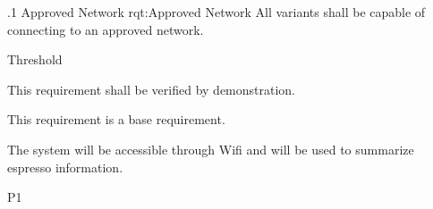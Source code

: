 \ONERQMTVKPP
{\RqtNumberBase.1}
{Approved Network}
{rqt:Approved Network}
{All \ThisSys variants shall be capable of connecting to an approved network.}
{
	\item [Phase 1] Threshold
}
{This requirement shall be verified by demonstration.}
{
	\item [N/A] This requirement is a base requirement.
}
{
  \item The system will be accessible through Wifi and will be used to summarize espresso information.
}
{P1}


